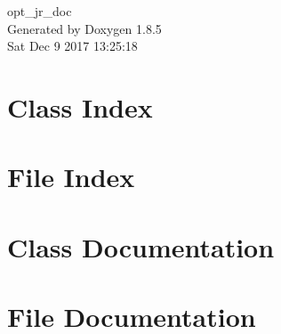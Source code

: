 \documentclass[twoside]{book}
\newcommand{\clearemptydoublepage}{%
  \newpage{\pagestyle{empty}\cleardoublepage}%
}
\begin{document}
\hypersetup{pageanchor=false}
\begin{titlepage}
\vspace*{7cm}
\begin{center}%
{\Large opt\-\_\-jr\-\_\-doc }\\
\vspace*{1cm}
{\large Generated by Doxygen 1.8.5}\\
\vspace*{0.5cm}
{\small Sat Dec 9 2017 13:25:18}\\
\end{center}
\end{titlepage}
\clearemptydoublepage
\tableofcontents
\clearemptydoublepage
{}
\hypersetup{pageanchor=true}

\chapter{Class Index}

\chapter{File Index}

\chapter{Class Documentation}









\chapter{File Documentation}


































\newpage
{}
{}
\printindex
\end{document}
